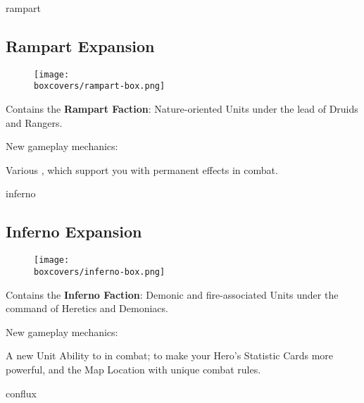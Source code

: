 \begin{multicols}{2}
\columnbreak
\begin{expansion}[title=]{rampart}
  \subsection*{\color{rampart}Rampart Expansion}
  \setlength\intextsep{0pt}
  \setlength\columnsep{0.8em}
  \begin{wrapfigure}{l}{0.35\textwidth}
    \texttt{[image: \\boxcovers/rampart-box.png]}
  \end{wrapfigure}
  Contains the \textbf{Rampart Faction}: Nature-oriented Units under the lead of Druids and Rangers.\par
  \medskip
  New gameplay mechanics:\par
  \smallskip
  Various , which support you with permanent effects in combat.
\end{expansion}

\vspace*{1em}
\begin{expansion}[title=]{inferno}
  \subsection*{\color{inferno}Inferno Expansion}
  \setlength\intextsep{0pt}
  \setlength\columnsep{0.8em}
  \begin{wrapfigure}{l}{0.35\textwidth}
    \texttt{[image: \\boxcovers/inferno-box.png]}
  \end{wrapfigure}
  Contains the \textbf{Inferno Faction}: Demonic and fire-associated Units under the command of Heretics and Demoniacs.\par
  \medskip
  New gameplay mechanics:\par
  \smallskip
  A new Unit Ability to  in combat;  to make your Hero's Statistic Cards more powerful, and the  Map Location with unique combat rules.
\end{expansion}

\vspace*{1em}
\begin{expansion}[title=]{conflux}

\end{expansion}
\end{multicols}
